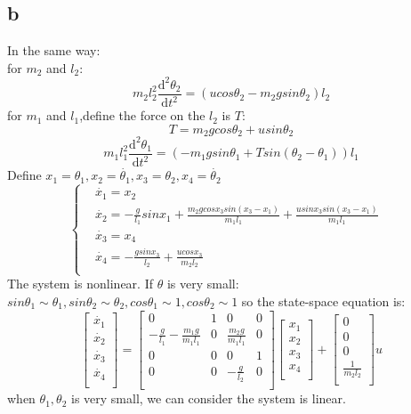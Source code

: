 \documentclass{article}
\begin{document}
\subsection*{b}
In the same way:\\
for $m_2$ and $l_2$:
\[m_2l_2^2 \frac{\mathrm{d}^2 \theta_2}{\mathrm{d}t^2}=(ucos\theta_2-m_2gsin\theta_2)l_2\]
for $m_1$ and $l_1$,define the force on the $l_2$ is $T$:\\
\[T=m_2gcos\theta_2+usin\theta_2\]
\[m_1l_1^2\frac{\mathrm{d}^2 \theta_1}{\mathrm{d}t^2}=(-m_1gsin\theta_1+Tsin(\theta_2-\theta_1))l_1\]
Define $x_1=\theta_1,x_2=\dot{\theta_1},x_3=\theta_2,x_4=\dot{\theta_2}$
\[\left\{
\begin{aligned}
&\dot{x_1}=x_2&\\
&\dot{x_2}=-\frac{g}{l_1}sinx_1+\frac{m_2gcosx_3sin(x_3-x_1)}{m_1l_1}+\frac{usinx_3sin(x_3-x_1)}{m_1l_1}&\\
&\dot{x_3}=x_4&\\
&\dot{x_4}=-\frac{gsinx_3}{l_2}+\frac{ucosx_3}{m_2l_2}&\\
\end{aligned}
\right.\]
The system is nonlinear.
If $\theta$ is very small:$sin\theta_1 \sim \theta_1,sin\theta_2 \sim \theta_2,cos\theta_1 \sim 1,cos\theta_2 \sim 1$
so the state-space equation is:
\begin{equation*}       %
\left[                %
\begin{array}{c}   %
\dot{x_1} \\  %
\dot{x_2} \\  %
\dot{x_3} \\
\dot{x_4} \\
\end{array}
\right]=      %
\left[                %
\begin{array}{cccc}   %
0 & 1 & 0 &0\\  %
-\frac{g}{l_1}-\frac{m_1g}{m_1l_1} & 0 &\frac{m_2g}{m_1l_1} & 0 \\  %
0 & 0 & 0 &1\\
0 & 0 & -\frac{g}{l_2} & 0\\
\end{array}
\right]
\left[                %
\begin{array}{c}   %
x_1 \\  %
x_2 \\  %
x_3 \\
x_4 \\
\end{array}
\right]+
\left[                %
\begin{array}{c}   %
0 \\  %
0 \\  %
0 \\
\frac{1}{m_2l_2}\\
\end{array}
\right]u                
\end{equation*}
when $\theta_1,\theta_2$ is very small, we can consider the system is linear.
\end{document}
